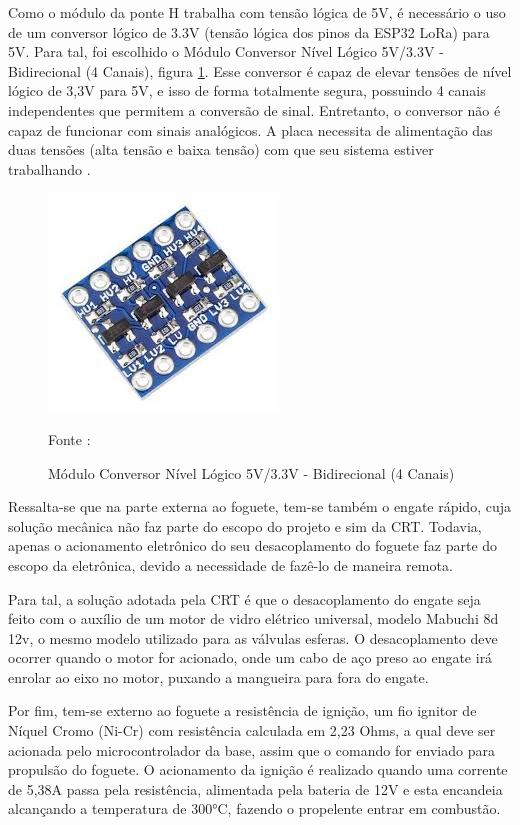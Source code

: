 \par Como o módulo da ponte H trabalha com tensão lógica de 5V, é necessário o uso de um conversor lógico de 3.3V (tensão lógica dos pinos da ESP32 LoRa) para 5V. Para tal, foi escolhido o Módulo Conversor Nível Lógico 5V/3.3V - Bidirecional (4 Canais), figura \ref{fig:CONV_LOGICO}. Esse conversor é capaz de elevar tensões de nível lógico de 3,3V para 5V, e isso de forma totalmente segura, possuindo 4 canais independentes que permitem a conversão de sinal. Entretanto, o conversor não é capaz de funcionar com sinais analógicos. A placa necessita de alimentação das duas tensões (alta tensão e baixa tensão) com que seu sistema estiver trabalhando \cite{Conversor_logico}.

\begin{figure}[H]
  \centering
  \includegraphics[scale=0.4]{figuras/conv_logico.jpeg}
  \caption{ Módulo Conversor Nível Lógico 5V/3.3V - Bidirecional (4 Canais)} 
  {\footnotesize Fonte : \cite{Conv_logico}} 
  \label{fig:CONV_LOGICO}
\end{figure}

\par Ressalta-se que na parte externa ao foguete, tem-se também o engate rápido, cuja solução mecânica não faz parte do escopo do projeto e sim da CRT. Todavia, apenas o acionamento eletrônico do seu desacoplamento do foguete faz parte do escopo da eletrônica, devido a necessidade de fazê-lo de maneira remota. 

\par Para tal, a solução adotada pela CRT é que o desacoplamento do engate seja feito com o auxílio de um motor de vidro elétrico universal, modelo Mabuchi 8d 12v, o mesmo modelo utilizado para as válvulas esferas. O desacoplamento deve ocorrer quando o motor for acionado, onde um cabo de aço preso ao engate irá enrolar ao eixo no motor, puxando a mangueira para fora do engate.

\par Por fim, tem-se externo ao foguete a resistência de ignição, um fio ignitor de Níquel Cromo (Ni-Cr) com resistência calculada em 2,23 Ohms, a qual deve ser acionada pelo microcontrolador da base, assim que o comando for enviado para propulsão do foguete. O acionamento da ignição é realizado quando uma corrente de 5,38A passa pela resistência, alimentada pela bateria de 12V e esta encandeia alcançando a temperatura de 300°C, fazendo o propelente entrar em combustão.

